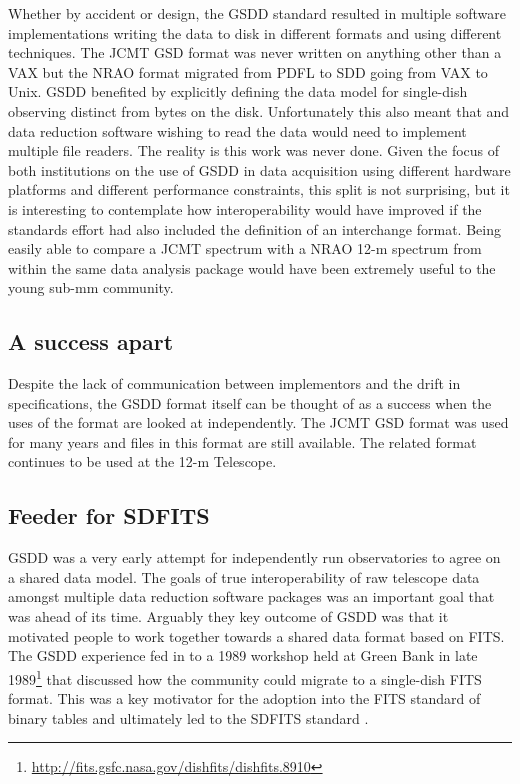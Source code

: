 \documentclass[final,authoryear,5p,times,twocolumn]{elsarticle}
\begin{document}
Whether by accident or design, the GSDD standard resulted in multiple
software implementations writing the data to disk in different formats
and using different techniques. The JCMT GSD format was never written
on anything other than a VAX but the NRAO format migrated from PDFL to
SDD going from VAX to Unix. GSDD benefited by explicitly defining the
data model for single-dish observing distinct from bytes on the
disk. Unfortunately this also meant that and data reduction software
wishing to read the data would need to implement multiple file
readers. The reality is this work was never done. Given the focus of
both institutions on the use of GSDD in data acquisition using
different hardware platforms and different performance constraints,
this split is not surprising, but it is interesting to contemplate how
interoperability would have improved if the standards effort had also
included the definition of an interchange format. Being easily able to
compare a JCMT spectrum with a NRAO 12-m spectrum from within the same
data analysis package would have been extremely useful to the young
sub-mm community.

\subsection{A success apart}

Despite the lack of communication between implementors and the drift
in specifications, the GSDD format itself can be thought of as a
success when the uses of the format are looked at independently. The JCMT GSD
format was used for many years and files in this format are still
available. The related format continues to be used at the 12-m Telescope.


\subsection{Feeder for SDFITS}
\label{sec:sdfits}

GSDD was a very early attempt for independently run observatories to
agree on a shared data model. The goals of true interoperability of
raw telescope data amongst multiple data reduction software packages
was an important goal that was ahead of its time. Arguably they key
outcome of GSDD was that it motivated people to work together towards
a shared data format based on FITS. The GSDD experience fed in to a
1989 workshop held at Green Bank in late
1989\footnote{\url{http://fits.gsfc.nasa.gov/dishfits/dishfits.8910}}
that discussed how the community could migrate to a
single-dish FITS format. This was a key motivator for the adoption
into the FITS standard of binary tables \citep{1995A&AS..113..159C}
and ultimately led to the SDFITS standard \citep{2000ASPC..216..243G}.
\end{document}
